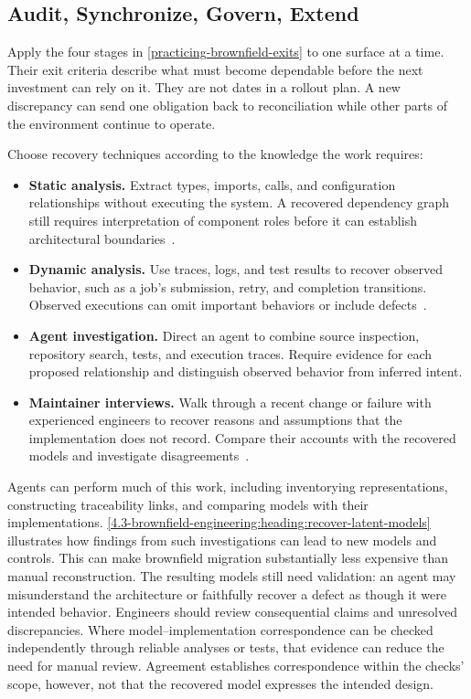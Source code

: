 \subsection{Audit, Synchronize, Govern, Extend}\label{heading:audit-synchronize-govern-extend}

Apply the four stages in \autoref{practicing-brownfield-exits} to one surface at a time. Their exit criteria describe what must become dependable before the next investment can rely on it. They are not dates in a rollout plan. A new discrepancy can send one obligation back to reconciliation while other parts of the environment continue to operate.

Choose recovery techniques according to the knowledge the work requires:

\begin{itemize}
\tightlist
\item \textbf{Static analysis.} Extract types, imports, calls, and configuration relationships without executing the system. A recovered dependency graph still requires interpretation of component roles before it can establish architectural boundaries~\citep{ducasse2009architecture,garcia2013groundtruth}.
\item \textbf{Dynamic analysis.} Use traces, logs, and test results to recover observed behavior, such as a job's submission, retry, and completion transitions. Observed executions can omit important behaviors or include defects~\citep{cornelissen2009dynamic,ammons2002mining}.
\item \textbf{Agent investigation.} Direct an agent to combine source inspection, repository search, tests, and execution traces. Require evidence for each proposed relationship and distinguish observed behavior from inferred intent.
\item \textbf{Maintainer interviews.} Walk through a recent change or failure with experienced engineers to recover reasons and assumptions that the implementation does not record. Compare their accounts with the recovered models and investigate disagreements~\citep{bjornson2008knowledge,anandayuvaraj2026failures}.
\end{itemize}

Agents can perform much of this work, including inventorying representations, constructing traceability links, and comparing models with their implementations. \autoref{4.3-brownfield-engineering:heading:recover-latent-models} illustrates how findings from such investigations can lead to new models and controls. This can make brownfield migration substantially less expensive than manual reconstruction. The resulting models still need validation: an agent may misunderstand the architecture or faithfully recover a defect as though it were intended behavior. Engineers should review consequential claims and unresolved discrepancies. Where model--implementation correspondence can be checked independently through reliable analyses or tests, that evidence can reduce the need for manual review. Agreement establishes correspondence within the checks' scope, however, not that the recovered model expresses the intended design.

